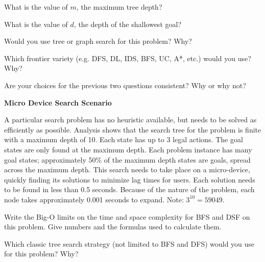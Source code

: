 \documentclass[11pt]{article}
\begin{document}
\begin{problem}{1}
  What is the value of $m$, the maximum tree depth?
  \vspace*{1.5in}
\end{problem}

\begin{problem}{1}
  What is the value of $d$, the depth of the shallowest goal?
  \vspace*{1.5in}
\end{problem}

\begin{problem}{1}
  Would you use tree or graph search for this problem?  Why?
  \vspace*{1.5in}
\end{problem}

\begin{problem}{1}
  Which frontier variety (e.g. DFS, DL, IDS, BFS, UC, A*, etc.) would you use?  Why?
  \vspace*{1.5in}
\end{problem}

\begin{problem}{2}
  Are your choices for the previous two questions consistent? Why or why not?
  \vspace*{1.5in}
\end{problem}


\newpage
\textbf{Micro Device Search Scenario}

A particular search problem has no heuristic available, but needs to be solved as efficiently as possible.  Analysis shows that the search tree for the problem is finite with a maximum depth of 10.  Each state has up to 3 legal actions.  The goal states are only found at the maximum depth.  Each problem instance has many goal states;  approximately 50\% of the maximum depth states are goals, spread across the maximum depth.  This search needs to take place on a micro-device, quickly finding its solutions to minimize lag times for users.  Each solution needs to be found in less than 0.5 seconds.  Because of the nature of the problem, each node takes approximately 0.001 seconds to expand.  Note: $3^{10} = 59049$.

\begin{problem}{2}

  Write the Big-O limits on the time and space complexity for BFS and DSF on this problem.  Give numbers and the formulas used to calculate them.
  
  \vspace*{2in}
  
\end{problem}

\begin{problem}{1}

  Which classic tree search strategy (not limited to BFS and DFS) would you use for this problem?
  Why?
  
  \vspace*{1in}
  
\end{problem}
\end{document}
